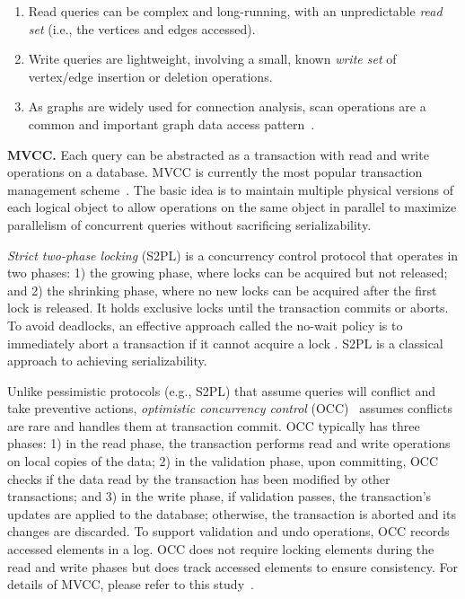 \begin{enumerate}[leftmargin=*]
\item Read queries can be complex and long-running, with an unpredictable \emph{read set} (i.e., the vertices and edges accessed).
\item Write queries are lightweight, involving a small, known \emph{write set} of vertex/edge insertion or deletion operations.
\item As graphs are widely used for connection analysis, scan operations are a common and important graph data access pattern~\cite{zhu2019livegraph,dhulipala2019low,de2021teseo,fuchs2022sortledton,ediger2012stinger,kumar2020graphone,macko2015llama,pandey2021terrace}.
\end{enumerate}

\noindent\textbf{MVCC.} Each query can be abstracted as a transaction with read and write operations on a database. MVCC is currently the most popular transaction management scheme~\cite{wu2017empirical}. The basic idea is to maintain multiple physical versions of each logical object to allow operations on the same object in parallel to maximize parallelism of concurrent queries without sacrificing serializability.

\emph{Strict two-phase locking} (S2PL) \cite{bernstein1987concurrency} is a concurrency control protocol that operates in two phases: 1) the growing phase, where locks can be acquired but not released; and 2) the shrinking phase, where no new locks can be acquired after the first lock is released. It holds exclusive locks until the transaction commits or aborts. To avoid deadlocks, an effective approach called the no-wait policy \cite{bernstein1981concurrency} is to immediately abort a transaction if it cannot acquire a lock \cite{yu2014staring}. S2PL is a classical approach to achieving serializability.

Unlike pessimistic protocols (e.g., S2PL) that assume queries will conflict and take preventive actions, \emph{optimistic concurrency control} (OCC)~\cite{larson2011high,neumann2015fast} assumes conflicts are rare and handles them at transaction commit. OCC typically has three phases: 1) in the read phase, the transaction performs read and write operations on local copies of the data; 2) in the validation phase, upon committing, OCC checks if the data read by the transaction has been modified by other transactions; and 3) in the write phase, if validation passes, the transaction's updates are applied to the database; otherwise, the transaction is aborted and its changes are discarded. To support validation and undo operations, OCC records accessed elements in a log. OCC does not require locking elements during the read and write phases but does track accessed elements to ensure consistency. For details of MVCC, please refer to this study~\cite{wu2017empirical}.

